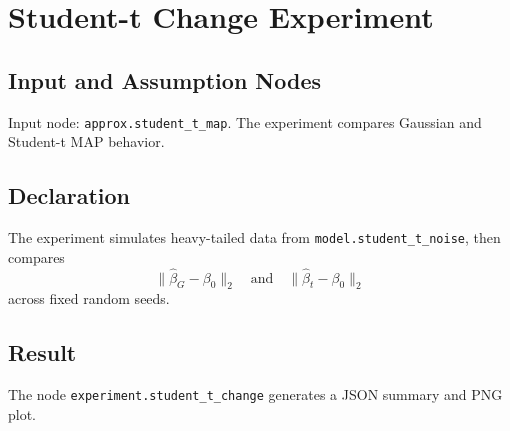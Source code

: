 \section{Student-t Change Experiment}
\label{experiment:student-t-change}

\subsection{Input and Assumption Nodes}
Input node: \texttt{approx.student\_t\_map}. The experiment compares Gaussian and Student-t MAP behavior.

\subsection{Declaration}
The experiment simulates heavy-tailed data from \texttt{model.student\_t\_noise}, then compares
\[
  \|\widehat{\beta}_{G}-\beta_0\|_2
  \quad\text{and}\quad
  \|\widehat{\beta}_{t}-\beta_0\|_2
\]
across fixed random seeds.

\subsection{Result}
The node \texttt{experiment.student\_t\_change} generates a JSON summary and PNG plot.
